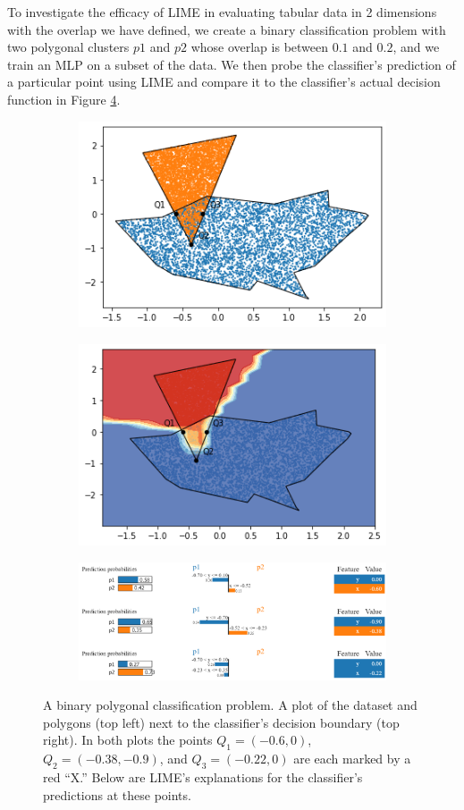 \documentclass[manuscript,screen,review]{acmart}
\begin{document}
To investigate the efficacy of LIME in evaluating tabular data in 2 dimensions with the overlap we have defined, we
create a binary classification problem with two polygonal clusters $p1$ and $p2$ whose overlap is between $0.1$ and
$0.2$, and we train an MLP on a subset of the data. We then probe the classifier's 
prediction of a particular point using LIME and compare it to the classifier's actual decision function in Figure
\ref{fig:2d-nn}.

\begin{figure}
    \centering
    \begin{subfigure}
        \centering
        \includegraphics[width=.4\textwidth]{images/nn-lime-ex.png}
        \label{nn-lime}
    \end{subfigure}
    \begin{subfigure}
        \centering
        \includegraphics[width=.4\textwidth]{images/nn-prob-ex.png}
        \label{nn-prob}
    \end{subfigure}
    \begin{subfigure}
        \centering
        \includegraphics[width=.8\textwidth]{images/lime-exp.png}
        \label{lime-exp-2d}
    \end{subfigure}
    \caption{
        A binary polygonal classification problem. A plot of the dataset and polygons (top left) next to the classifier's
        decision boundary (top right). In both plots the points $Q_1 = (-0.6, 0)$, $Q_2 = (-0.38, -0.9)$,
        and $Q_3 = (-0.22, 0)$ are each marked by a red ``X.'' Below are LIME's explanations for the classifier's 
        predictions at these points.
    }
    \label{fig:2d-nn}
\end{figure}
\end{document}

